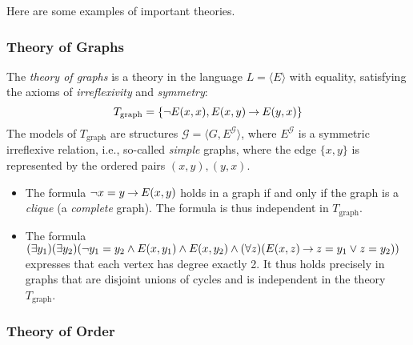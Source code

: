 Here are some examples of important theories.

\subsubsection{Theory of Graphs}

The \emph{theory of graphs} is a theory in the language $L=\langle E\rangle$ with equality, satisfying the axioms of \emph{irreflexivity} and \emph{symmetry}:
$$
T_\text{graph}=\{\neg E(x, x),E(x,y)\mathbin{\rightarrow} E(y,x)\}
$$
The models of $T_\text{graph}$ are structures $\mathcal G=\langle G,E^\mathcal G\rangle$, where $E^\mathcal G$ is a symmetric irreflexive relation, i.e., so-called \emph{simple} graphs, where the edge $\{x,y\}$ is represented by the ordered pairs $(x,y),(y,x)$.
\begin{itemize}
    \item The formula $\neg x=y\mathbin{\rightarrow} E(x,y)$ holds in a graph if and only if the graph is a \emph{clique} (a \emph{complete} graph). The formula is thus independent in $T_\text{graph}$.
    \item The formula $(\exists y_1)(\exists y_2)(\neg y_1=y_2\land E(x,y_1)\land E(x,y_2)\land (\forall z)(E(x,z)\mathbin{\rightarrow} z=y_1\lor z=y_2))$ expresses that each vertex has degree exactly 2. It thus holds precisely in graphs that are disjoint unions of cycles and is independent in the theory $T_\text{graph}$.
\end{itemize}

\subsubsection{Theory of Order}

